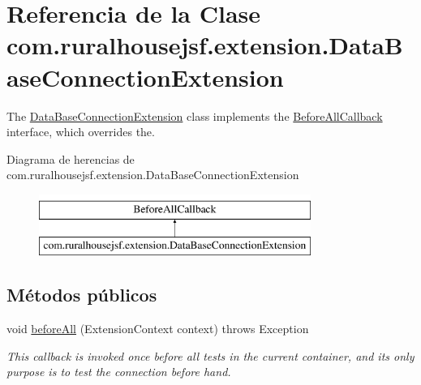 \hypertarget{a00264}{}\section{Referencia de la Clase com.\+ruralhousejsf.\+extension.\+Data\+Base\+Connection\+Extension}
\label{a00264}


The \mbox{\hyperlink{a00264}{Data\+Base\+Connection\+Extension}} class implements the \mbox{\hyperlink{}{Before\+All\+Callback}} interface, which overrides the.  


Diagrama de herencias de com.\+ruralhousejsf.\+extension.\+Data\+Base\+Connection\+Extension\begin{figure}[H]
\begin{center}
\leavevmode
\includegraphics[height=2.000000cm]{a00264}
\end{center}
\end{figure}
\subsection*{Métodos públicos}
\begin{DoxyCompactItemize}
\item 
void \mbox{\hyperlink{a00264_ae1fe703d5f0bdd5f29f0f4b9f0645e3e}{before\+All}} (Extension\+Context context)  throws Exception 
\begin{DoxyCompactList}\small\item\em This callback is invoked once {\ttfamily before} all tests in the current container, and its only purpose is to test the connection before hand. \end{DoxyCompactList}\end{DoxyCompactItemize}
